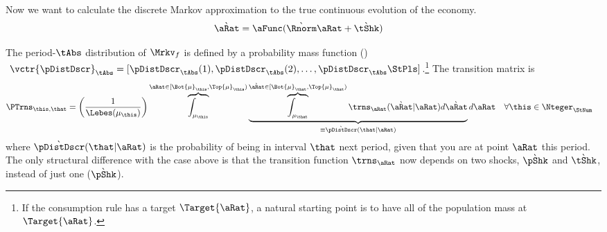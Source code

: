 \documentclass[../BufferStockTheory.tex]{subfiles}\usepackage{ApndxSteadyState}
\begin{document}
Now we want to calculate the discrete Markov approximation to the true continuous evolution of the economy. 
  \begin{equation}\begin{gathered}\begin{aligned}
    \Nxt{\point} & = \aFunc(\Nxt{\Rnorm} \point + \Nxt{\tShk})
  \end{aligned}\end{gathered}\end{equation}


  The period-$\tAbs$ distribution of $\Mrkv_{f}$ is defined by a probability mass function (\pmf)$~\vctr{\pDistDscr}_{\tAbs} = [\pDistDscr_{\tAbs}(1),\pDistDscr_{\tAbs}(2),\dots,\pDistDscr_{\tAbs}\StPls]$.\footnote{If the consumption rule has a target $\Target{\aRat}$, a natural starting point is to have all of the population mass at $\Target{\aRat}$.}  The transition matrix is 
  \begin{equation}\begin{gathered}\begin{aligned}
    \PTrns_{\this,\that} &= \left(\frac{1}{\Lebes(\SetSub_{\this})}\right)\overbrace{\int_{\SetSub_{\this}}}^{\point\in[\Bot{\SetSub}_{\this},\Top{\SetSub}_{\this})}\underbrace{\overbrace{\int_{\SetSub_{\that}}}^{\Nxt{\point}\in[\Bot{\SetSub}_{\that},\Top{\SetSub}_{\that})}\trns_{\point}(\Nxt{\point}|\point){d\Nxt{\point}}}_{\equiv \Nxt{\pDistDscr}(\that|\point)} {d\point}~~~\forall\this\in\Nteger_{\StNum} \label{eq:thispTOthatp}
  \end{aligned}\end{gathered}\end{equation}
  where $\Nxt{\pDistDscr}(\that|\point)$ is the probability of being in interval $\that$ next period, given that you are at point $\point$ this period.
  The only structural difference with the case above is that the transition function $\trns_{\point}$ now depends on two shocks, $\Nxt{\pShk}$ and $\Nxt{\tShk}$, instead of just one ($\Nxt{\pShk}$).

  \begin{comment}
    Equation \eqref{eq:stateDensity} translates to
    \begin{equation}\begin{gathered}\begin{aligned}
      \pDens_{\tAbs+1}(\Nxt{\point}) &= \int_{\DistSetSprtFull} \trns_{\point}(\Nxt{\point}|\point)\pDens_{\tAbs}(\point)d\point ~~~~ \forall~\Nxt{\point} \in \DistSetSprtFull \label{eq:stateDensity}
    \end{aligned}\end{gathered}\end{equation}
  \end{comment}
\end{document}
